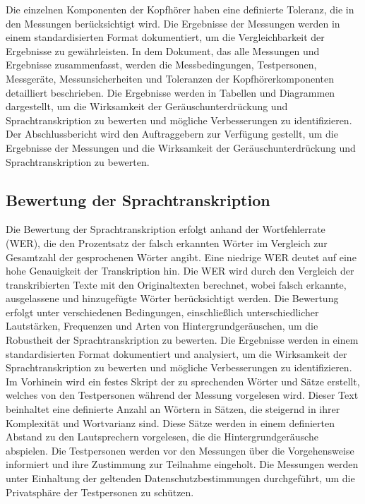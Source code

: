 \documentclass{article}
\begin{document}
    Die einzelnen Komponenten der Kopfhörer haben eine definierte Toleranz, die in den Messungen berücksichtigt wird. Die Ergebnisse der Messungen werden in einem standardisierten Format dokumentiert, um die Vergleichbarkeit der Ergebnisse zu gewährleisten.
    In dem Dokument, das alle Messungen und Ergebnisse zusammenfasst, werden die Messbedingungen, Testpersonen, Messgeräte, Messunsicherheiten und Toleranzen der Kopfhörerkomponenten detailliert beschrieben. Die Ergebnisse werden in Tabellen und Diagrammen dargestellt, um die Wirksamkeit der Geräuschunterdrückung und Sprachtranskription zu bewerten und mögliche Verbesserungen zu identifizieren. Der Abschlussbericht wird den Auftraggebern zur Verfügung gestellt, um die Ergebnisse der Messungen und die Wirksamkeit der Geräuschunterdrückung und Sprachtranskription zu bewerten.

    \subsection{Bewertung der Sprachtranskription}
    Die Bewertung der Sprachtranskription erfolgt anhand der Wortfehlerrate (WER), die den Prozentsatz der falsch erkannten Wörter im Vergleich zur Gesamtzahl der gesprochenen Wörter angibt. Eine niedrige WER deutet auf eine hohe Genauigkeit der Transkription hin. Die WER wird durch den Vergleich der transkribierten Texte mit den Originaltexten berechnet, wobei falsch erkannte, ausgelassene und hinzugefügte Wörter berücksichtigt werden. Die Bewertung erfolgt unter verschiedenen Bedingungen, einschließlich unterschiedlicher Lautstärken, Frequenzen und Arten von Hintergrundgeräuschen, um die Robustheit der Sprachtranskription zu bewerten. Die Ergebnisse werden in einem standardisierten Format dokumentiert und analysiert, um die Wirksamkeit der Sprachtranskription zu bewerten und mögliche Verbesserungen zu identifizieren.
    Im Vorhinein wird ein festes Skript der zu sprechenden Wörter und Sätze erstellt, welches von den Testpersonen während der Messung vorgelesen wird. Dieser Text beinhaltet eine definierte Anzahl an Wörtern in Sätzen, die steigernd in ihrer Komplexität und Wortvarianz sind. Diese Sätze werden in einem definierten Abstand zu den Lautsprechern vorgelesen, die die Hintergrundgeräusche abspielen. Die Testpersonen werden vor den Messungen über die Vorgehensweise informiert und ihre Zustimmung zur Teilnahme eingeholt. Die Messungen werden unter Einhaltung der geltenden Datenschutzbestimmungen durchgeführt, um die Privatsphäre der Testpersonen zu schützen. 
\end{document}

